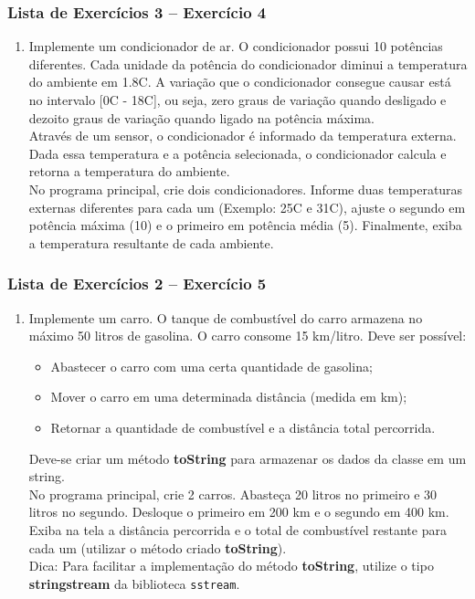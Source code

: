 \documentclass[aspectratio=169]{beamer}
\newcommand\setItemnumber[1]{\setcounter{enumi}{\numexpr#1-1\relax}}
\begin{document}
\begin{frame}\frametitle{Lista de Exercícios 3 -- Exercício 4}
\begin{enumerate}
	\setItemnumber{4}
	\item Implemente um condicionador de ar. O condicionador possui 10 potências diferentes. Cada unidade da potência do condicionador diminui a temperatura do ambiente em 1.8\degree{}C. A variação que o condicionador consegue causar está no intervalo [0\degree{}C - 18\degree{}C], ou seja, zero graus de variação quando desligado e dezoito graus de variação quando ligado na potência máxima.\\
	Através de um sensor, o condicionador é informado da temperatura externa. Dada essa temperatura e a potência selecionada, o condicionador calcula e retorna a temperatura do ambiente.\\
	No programa principal, crie dois condicionadores. Informe duas temperaturas externas diferentes para cada um (Exemplo: 25\degree{}C e 31\degree{}C), ajuste o segundo em potência máxima (10) e o primeiro em potência média (5). Finalmente, exiba a temperatura resultante de cada ambiente.
\end{enumerate}
\end{frame}

\begin{frame}\frametitle{Lista de Exercícios 2 -- Exercício 5}
\begin{enumerate}
	\setItemnumber{5}
	\item Implemente um carro. O tanque de combustível do carro armazena no máximo 50 litros de gasolina. O carro consome 15 km/litro. Deve ser possível:
	\begin{itemize}
		\item Abastecer o carro com uma certa quantidade de gasolina;
		\item Mover o carro em uma determinada distância (medida em km);
		\item Retornar a quantidade de combustível e a distância total percorrida.
	\end{itemize}
	Deve-se criar um método \textbf{toString} para armazenar os dados da classe em um string.\\
	No programa principal, crie 2 carros. Abasteça 20 litros no primeiro e 30 litros no segundo.   Desloque o primeiro em 200 km e o segundo em 400 km. Exiba na tela a distância percorrida e o total de combustível restante para cada um (utilizar o método criado \textbf{toString}).\\
	Dica: Para facilitar a implementação do método \textbf{toString}, utilize o tipo \textbf{stringstream} da biblioteca \texttt{sstream}.
\end{enumerate}
\end{frame}
\end{document}
